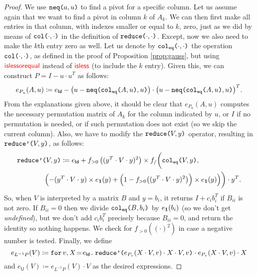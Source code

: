 \begin{proof}
    We use $\nneq{a}{u}$ to find a pivot for a specific column. Let us assume again that we
    want to find a pivot in column $k$ of $A_k$. We can then first make all entries in that column, with indexes smaller or equal to $k$, zero, just as we did by means of $\ccol{\cdot}{\cdot}$ in the
    definition of $\red{\cdot}{\cdot}$. Except, now we also need to make the $k$th entry zero as well.
    Let us denote by $\ccoleq{\cdot}{\cdot}$ the operation $\ccol{\cdot}{\cdot}$, as defined in the proof of Proposition \ref{prop:gauss}, but using $\EDIT{\islessorequal}$ instead of $\EDIT{\isless}$ (to include the $k$ entry). Given this, we can construct $P=I-u\cdot u^T$ as follows:
    $$
    e_{P_u}(A,u) \coloneqq  e_{\mathsf{Id}} - \bigl(u - \nneq{ \ccoleq{A}{u} }{u} \bigr)\cdot \bigl(u - \nneq{ \ccoleq{A}{u} }{u} \bigr)^T.
    $$ 
    From the explanations given above, it should be clear that $e_{P_u}(A,u)$ computes the necessary permutation matrix of $A_k$ for the column indicated by $u$, or $I$
    if no permutation is needed, or if such permutation does not exist (so we skip the current column). Also, we have to modify the $\red{V}{y}$ operator, resulting in $\redd{V}{y}$, as follows:
    \begin{align*}
        &\redd{V}{y}\coloneqq  e_{\mathsf{Id}}+ f_{>0}\left( ( y^T\cdot V\cdot y)^2 \right)\times f_/\biggl(\ccoleq{V}{y}, \\
        &\hspace{4em}\Bigl(-(y^T\cdot V\cdot y)\times e_{\ones}(y) + \Bigl( 1 - f_{>0}\bigl(( y^T\cdot V\cdot y)^2 \bigr) \Bigr)\times e_{\ones}(y) \Bigr)\biggr)\cdot y^T. 
    \end{align*}
    So, when $V$ is interpreted by a matrix $B$ and $y=b_i$, it returns $I+c_ib_i^T$ if $B_{ii}$ is not zero. 
    If $B_{ii}=0$ then we divide $\ccoleq{B}{b_i}$ by $e_{\ones}(b_i)$ (so we don't get \textit{undefined}), 
    but we don't add $c_ib_i^T$ precisely because $B_{ii}=0$, and return the identity so nothing happens. We check 
    for $f_{>0}((\cdot)^2)$ in case a negative number is tested.
    Finally, we define
    $$
    e_{L^{-1}P}(V)\coloneqq \initf{e_{\mathsf{Id}}}{v}{X}{\redd{e_{P_v}(X\cdot V,v)\cdot X\cdot V}{v}\cdot e_{P_v}(X\cdot V,v)\cdot X}
    $$
    and $e_{\mathsf{U}}(V)\coloneqq e_{L^{-1}P}(V)\cdot V$ as the desired expressions.


\end{proof}
